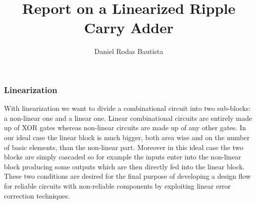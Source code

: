 \documentclass{beamer}
\title{Report on a Linearized Ripple Carry Adder}
\subtitle{}
\author{Daniel Rodas Bautista}%
\begin{document}
\frame{\titlepage}
\begin{frame}
\frametitle{Linearization}
With linearization we want to divide a combinational circuit into two sub-blocks: a non-linear one and a linear one. Linear combinational circuits are entirely made up of XOR gates whereas non-linear circuits are made up of any other gates. In our ideal case the linear block is much bigger, both area wise and on the number of basic elements, than the non-linear part. Moreover in this ideal case the two blocks are simply cascaded so for example the inputs enter into the non-linear block producing some outputs which are then directly fed into the linear block. These two conditions are desired for the final purpose of developing a design flow for reliable circuits with non-reliable components by exploiting linear error correction techniques.  
\end{frame}
\end{document}
